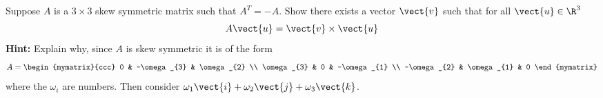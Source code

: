 \begin{enumialphparenastyle}
\begin{ex} Suppose $A$ is a $3\times 3$ skew symmetric matrix such that $A^{T}=-A$. Show
there exists a vector $\vect{v}$ such that for all $\vect{u}\in
\R^{3}$
\begin{equation*}
A\vect{u}=\vect{v} \times \vect{u}
\end{equation*}
\textbf{Hint: }Explain why, since $A$ is skew symmetric it is of the form
\begin{equation*}
A=\begin{mymatrix}{ccc}
0 & -\omega _{3} & \omega _{2} \\
\omega _{3} & 0 & -\omega _{1} \\
-\omega _{2} & \omega _{1} & 0
\end{mymatrix}
\end{equation*}
where the $\omega _{i}$ are numbers. Then consider $\omega _{1}\vect{i}
+\omega _{2}\vect{j}+\omega _{3}\vect{k}$.
\end{ex}

\end{enumialphparenastyle}
